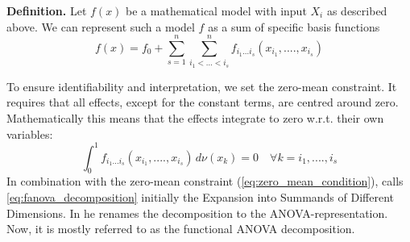 \textbf{Definition.} Let $f(x)$  be a mathematical model with input $X_i$ as described above. We can represent such a model $f$ as a sum of specific basis functions
\begin{equation}
    f(x) = f_0 + \sum_{s=1}^{n} \sum_{i_1 <...<i_s}^{n} f_{i_{1}...i_{s}} (x_{i_{1}} , ....,x_{i_{s}})
    \label{eq:fanova_decomposition}
\end{equation}

To ensure identifiability and interpretation, we set the zero-mean constraint. It requires that all effects, except for the constant terms, are centred around zero.
Mathematically this means that the effects integrate to zero w.r.t. their own variables:
\begin{equation}
    \int_{0}^{1} f_{i_{1}...i_{s}} (x_{i_{1}}, ...., x_{i_{s}}) \, d\nu (x_k) = 0 \quad \forall k = i_1, ...., i_s
    \label{eq:zero_mean_condition}
\end{equation}
In combination with the zero-mean constraint (\autoref{eq:zero_mean_condition}),  \cite{sobol1993sensitivity} calls \autoref{eq:fanova_decomposition} initially the \ldq Expansion into Summands of Different Dimensions\rdq. In \cite{sobol2001} he renames the decomposition to the \ldq ANOVA-representation\rdq. Now, it is mostly referred to as the \ldq functional ANOVA decomposition\rdq \citep{hooker2004}.\par


